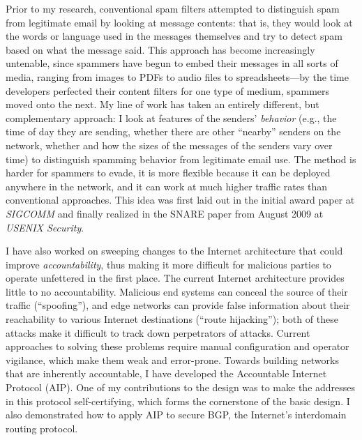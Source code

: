 Prior to my research, conventional spam filters attempted to distinguish
spam from legitimate email by looking at message contents: that is, they
would look at the words or language used in the messages themselves and
try to detect spam based on what the message said.  This approach has
become increasingly untenable, since spammers have begun to embed their
messages in all sorts of media, ranging from images to PDFs to audio
files to spreadsheets---by the time developers perfected their content
filters for one type of medium, spammers moved onto the next.  My line
of work has taken an entirely different, but complementary approach: I
look at features of the senders' {\em behavior} (e.g., the time of day
they are sending, whether there are other ``nearby'' senders on the
network, whether and how the sizes of the messages of the senders vary
over time) to distinguish spamming behavior from legitimate email use.
The method is harder for spammers to evade, it is more flexible because
it can be deployed anywhere in the network, and it can work at much
higher traffic rates than conventional approaches.  This idea was first
laid out in the initial award paper at {\em SIGCOMM} and finally
realized in the SNARE paper from August 2009 at {\em USENIX Security}.

I have also worked on sweeping changes to the Internet architecture that
could improve {\em accountability}, thus making it more difficult for
malicious parties to operate unfettered in the first place.  The current
Internet architecture provides little to no accountability. Malicious
end systems can conceal the source of their traffic (``spoofing''), and
edge networks can provide false information about their reachability to
various Internet destinations (``route hijacking''); both of these
attacks make it difficult to track down perpetrators of attacks.
Current approaches to solving these problems require manual
configuration and operator vigilance, which make them weak and
error-prone.  Towards building networks that are inherently accountable,
I have developed the Accountable Internet Protocol (AIP).  One of my
contributions to the design was to make the addresses in this protocol
self-certifying, which forms the cornerstone of the basic design.  I
also demonstrated how to apply AIP to secure BGP, the Internet's
interdomain routing protocol.


